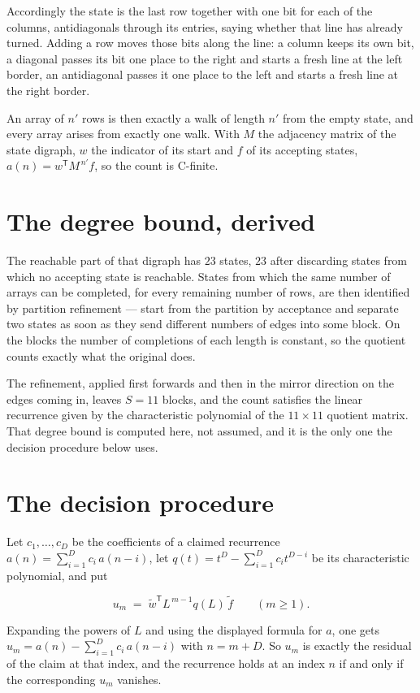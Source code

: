 \documentclass[11pt]{article}
\theoremstyle{definition}
\begin{document}
Accordingly the state is the last row together with one bit for each of the columns, antidiagonals through its entries, saying whether that line has already turned. Adding a row moves those bits along the line: a column keeps its own bit, a diagonal passes its bit one place to the right and starts a fresh line at the left border, an antidiagonal passes it one place to the left and starts a fresh line at the right border.

An array of $n'$ rows is then exactly a walk of length $n'$ from the empty state, and every array arises from exactly one walk. With $M$ the adjacency matrix of the state digraph, $w$ the indicator of its start and $f$ of its accepting states, $a(n) = w^{\mathsf T}M^{\,n'}f$, so the count is C-finite.

\section{The degree bound, derived}

The reachable part of that digraph has $23$ states, $23$ after discarding states from which no accepting state is reachable. States from which the same number of arrays can be completed, for every remaining number of rows, are then identified by partition refinement --- start from the partition by acceptance and separate two states as soon as they send different numbers of edges into some block. On the blocks the number of completions of each length is constant, so the quotient counts exactly what the original does.

The refinement, applied first forwards and then in the mirror direction on the edges coming in, leaves $S = 11$ blocks, and the count satisfies the linear recurrence given by the characteristic polynomial of the $11 \times 11$ quotient matrix. That degree bound is computed here, not assumed, and it is the only one the decision procedure below uses.

\section{The decision procedure}

Let $c_1,\dots,c_D$ be the coefficients of a claimed recurrence $a(n) = \sum_{i=1}^{D} c_i\,a(n-i)$, let $q(t) = t^{D} - \sum_{i=1}^{D} c_i t^{D-i}$ be its characteristic polynomial, and put

\[u_m \;=\; \tilde w^{\mathsf T} L^{\,m-1} q(L)\,\tilde f \qquad (m \ge 1).\]

Expanding the powers of $L$ and using the displayed formula for $a$, one gets $u_m = a(n) - \sum_{i=1}^{D} c_i\,a(n-i)$ with $n = m + D$. So $u_m$ is exactly the residual of the claim at that index, and the recurrence holds at an index $n$ if and only if the corresponding $u_m$ vanishes.
\end{document}
